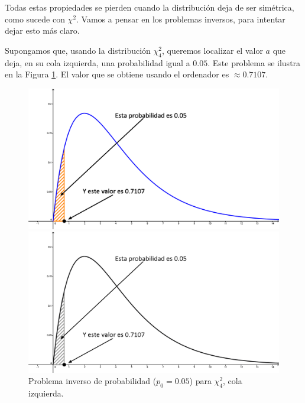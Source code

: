 Todas estas propiedades se pierden cuando la distribución deja de ser
simétrica, como sucede con $\chi^2$. Vamos a pensar en los problemas inversos,
para intentar dejar esto más claro.

\begin{ejemplo}
\label{cap06:ejem:ProblemaDirectoInversoProbabilidadChi}

Supongamos que, usando la distribución
$\chi^2_4$, queremos localizar el valor $a$ que deja, en su cola  izquierda,
una probabilidad igual a $0.05$. Este problema se ilustra en la Figura
\ref{cap06:fig:ChiCuadradoProblemaInversoIzquierda}. El valor que se obtiene
usando el ordenador es $\approx 0.7107$.

\begin{figure}[htb]
\begin{center}
\begin{enColor}
\includegraphics[width=13cm]{../fig/Cap06-ChiCuadradoProblemaInversoIzquierda.png}
\end{enColor}
\begin{bn}
\includegraphics[width=13cm]{../fig/Cap06-ChiCuadradoProblemaInversoIzquierda-bn.png}
\end{bn}
\caption{Problema inverso de probabilidad ($p_0=0.05$) para $\chi^2_4$, cola izquierda.}
\label{cap06:fig:ChiCuadradoProblemaInversoIzquierda}
\end{center}
\end{figure}


\end{ejemplo}
